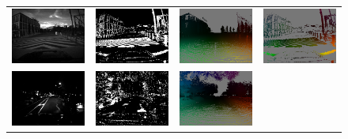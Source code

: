 \begin{figure}
\begin{tabular}{@{}cccc@{}}
    \includegraphics[width=0.245\linewidth]{mainmatter/figures/3_optical_flow/results_mvsec/outdoor_day1_grayscale.png} &
    \includegraphics[width=0.245\linewidth]{mainmatter/figures/3_optical_flow/results_mvsec/outdoor_day1_edges.png} &
    \includegraphics[width=0.245\linewidth]{mainmatter/figures/3_optical_flow/results_mvsec/outdoor_day1_ground_truth_lightgray.png} &
    \includegraphics[width=0.245\linewidth]{mainmatter/figures/3_optical_flow/results_mvsec/outdoor_day1_our_flow_gray.png} \\
    \includegraphics[width=0.245\linewidth]{mainmatter/figures/3_optical_flow/results_mvsec/outdoor_night1_grayscale.png} &
    \includegraphics[width=0.245\linewidth]{mainmatter/figures/3_optical_flow/results_mvsec/outdoor_night1_edges.png} &
    \includegraphics[width=0.245\linewidth]{mainmatter/figures/3_optical_flow/results_mvsec/outdoor_night1_ground_truth_lightgray.png} &

\end{tabular}
\end{figure}
